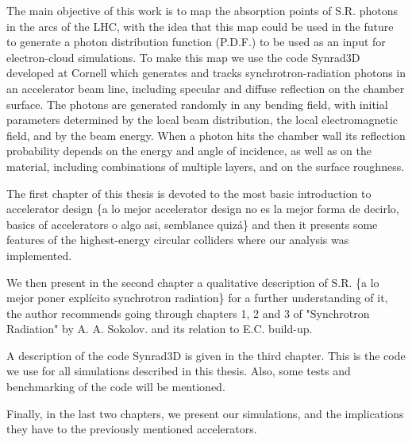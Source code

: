 The main objective of this work is to map the absorption points of S.R. photons
in the arcs of the LHC, with the idea that this map could be used in the future
to generate a photon distribution function (P.D.F.) to be used as an input for
electron-cloud simulations. To make this map we use the code Synrad3D developed
at Cornell which generates and tracks synchrotron-radiation photons in an
accelerator beam line, including specular and diffuse reflection on the chamber
surface.  The photons are generated randomly in any bending field, with initial
parameters determined by the local beam distribution, the local electromagnetic
field, and by the beam energy.  When a photon hits the chamber wall its
reflection probability depends on the energy and angle of incidence, as well as
on the material, including combinations of multiple layers, and on the surface
roughness.

The first chapter of this thesis is devoted to the most basic introduction to
accelerator design \rojo\{a lo mejor accelerator design no es la mejor forma de
decirlo, basics of accelerators o algo asi, semblance quizá\} and then it
presents some features  of the highest-energy circular colliders where our analysis was
implemented.

We then present in the second chapter a qualitative description of S.R. \rojo\{a
lo mejor poner explícito synchrotron radiation\} for a further understanding of
it, the author recommends going through chapters 1, 2 and 3 of "Synchrotron
Radiation" by A. A. Sokolov.  and its relation to E.C. build-up.

A description of the code Synrad3D is given in the third chapter. This is the
code we use for all simulations described in this thesis. Also, some tests and
benchmarking of the code will be mentioned.

Finally, in the last two chapters, we present our simulations, and the
implications they have to the previously mentioned accelerators.



